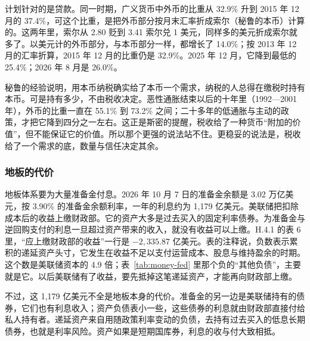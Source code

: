 计划针对的是贷款。同一时期，广义货币中外币的比重从 32.9\% 升到 2015 年 12 月的 37.4\%，可这个比重，是把外币部分按月末汇率折成索尔（秘鲁的本币）计算的。这两年里，索尔从 2.80 贬到 3.41 索尔兑 1 美元，同样多的美元折成索尔就多了。以美元计的外币部分，与本币部分一样，都增长了 14.0\%；按 2013 年 12 月的汇率折算，2015 年 12 月的比重仍是 32.9\%\cite{bcrp2026}。2025 年 12 月，它降到最低的 25.4\%；2026 年 8 月是 26.0\%\cite{bcrp2026}。

秘鲁的经验说明，用本币纳税确实给了本币一个需求，纳税的人总得在缴税时持有本币。可是持有多少，不由税收决定。恶性通胀结束以后的十年里（1992—2001 年），外币的比重一直在 55.1\% 到 73.2\% 之间；二十多年的低通胀与主动的政策，才把它降到四分之一左右。这正是斯密的提醒，税收给了一种货币“附加的价值”，但不能保证它的价值。所以那个更强的说法站不住。更稳妥的说法是，税收给了一个需求的底，数量与信任决定其余。


\subsubsection{地板的代价}
地板体系要为大量准备金付息。2026 年 10 月 7 日的准备金余额是 3.02 万亿美元，按 3.90\% 的准备金余额利率，一年的利息约为 1,179 亿美元。美联储把扣除成本后的收益上缴财政部。它的资产大多是过去买入的固定利率债券。为准备金与逆回购支付的利息一旦超过资产带来的收入，就没有收益可以上缴。H.4.1 的表 6 里，“应上缴财政部的收益”一行是 $-2{,}335.87$ 亿美元。表的注释说，负数表示累积的递延资产头寸，它发生在收益不足以支付运营成本、股息与维持盈余的时期\cite{h41_2026}。这个数是美联储资本的 4.9 倍；表~\ref{tab:money-fed} 里那个负的“其他负债”，主要就是它。以后美联储有了收益，要先抵掉这笔递延资产，才能再向财政部上缴。

不过，这 1,179 亿美元不全是地板本身的代价。准备金的另一边是美联储持有的债券，它们也有利息收入；资产负债表小一些，这些债券的利息就由财政部直接付给私人持有者。递延资产来自用随政策利率变动的负债，去持有过去买入的低息长期债券，也就是利率风险。资产如果是短期国库券，利息的收与付大致相抵。

